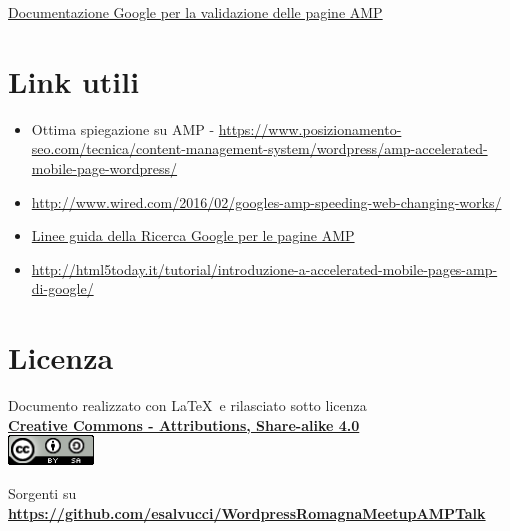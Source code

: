 \documentclass{article}
\begin{document}
\href{https://www.ampproject.org/docs/guides/validate.html}{Documentazione Google per la validazione delle pagine AMP}

\section{Link utili}
\begin{itemize}
    \item Ottima spiegazione su AMP - \href{https://www.posizionamento-seo.com/tecnica/content-management-system/wordpress/amp-accelerated-mobile-page-wordpress/}{https://www.posizionamento-seo.com/tecnica/content-management-system/wordpress/amp-accelerated-mobile-page-wordpress/}
    \item \href{http://www.wired.com/2016/02/googles-amp-speeding-web-changing-works/}{http://www.wired.com/2016/02/googles-amp-speeding-web-changing-works/}
    \item \href{https://support.google.com/webmasters/answer/6340290?hl=it}{Linee guida della Ricerca Google per le pagine AMP}
    \item \href{http://html5today.it/tutorial/introduzione-a-accelerated-mobile-pages-amp-di-google/}{http://html5today.it/tutorial/introduzione-a-accelerated-mobile-pages-amp-di-google/}
\end{itemize}

\section{Licenza}

Documento realizzato con \LaTeX\ e rilasciato sotto licenza\\
\textbf{\href{http://creativecommons.org/licenses/by-sa/4.0/}{Creative Commons - Attributions, Share-alike 4.0}}\\

\includegraphics[height=0.8cm]{images/cc.png}

Sorgenti su \textbf{\url{https://github.com/esalvucci/WordpressRomagnaMeetupAMPTalk}}
\end{document}
